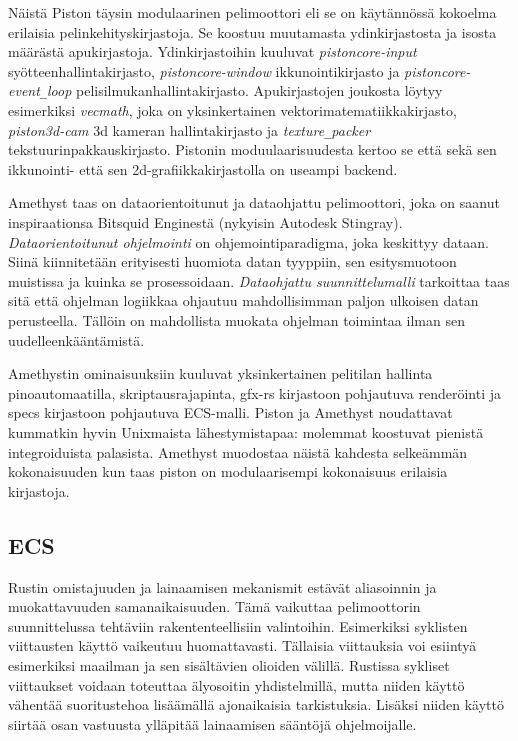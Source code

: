 \documentclass[finnish]{tktltiki2}
\theoremstyle{definition}
\theoremstyle{remark}
\begin{document}
Näistä Piston täysin modulaarinen pelimoottori eli se on käytännössä kokoelma erilaisia pelinkehityskirjastoja. Se koostuu muutamasta ydinkirjastosta ja isosta määrästä apukirjastoja. Ydinkirjastoihin kuuluvat \textit{pistoncore-input} syötteenhallintakirjasto, \textit{pistoncore-window} ikkunointikirjasto ja \textit{pistoncore-event\texttt{\_}loop} pelisilmukanhallintakirjasto. Apukirjastojen joukosta löytyy esimerkiksi \textit{vecmath}, joka on yksinkertainen vektorimatematiikkakirjasto, \textit{piston3d-cam} 3d kameran hallintakirjasto ja \textit{texture\texttt{\_}packer} tekstuurinpakkauskirjasto. Pistonin moduulaarisuudesta kertoo se että sekä sen ikkunointi- että sen 2d-grafiikkakirjastolla on useampi backend.  

Amethyst\cite{Amethyst} taas on dataorientoitunut ja dataohjattu pelimoottori, joka on saanut inspiraationsa Bitsquid Enginestä (nykyisin Autodesk Stingray)\cite{AmethystReadme}. \textit{Dataorientoitunut ohjelmointi} on ohjemointiparadigma, joka keskittyy dataan. Siinä kiinnitetään erityisesti huomiota datan tyyppiin, sen esitysmuotoon muistissa ja kuinka se prosessoidaan. \textit{Dataohjattu suunnittelumalli} tarkoittaa taas sitä että ohjelman logiikkaa ohjautuu mahdollisimman paljon ulkoisen datan perusteella. Tällöin on mahdollista muokata ohjelman toimintaa ilman sen uudelleenkääntämistä. \cite{AmethystGlossary}

Amethystin ominaisuuksiin kuuluvat yksinkertainen pelitilan hallinta pinoautomaatilla, skriptausrajapinta, gfx-rs kirjastoon pohjautuva renderöinti ja specs kirjastoon pohjautuva ECS-malli. Piston ja Amethyst noudattavat kummatkin hyvin Unixmaista lähestymistapaa: molemmat koostuvat pienistä integroiduista palasista. Amethyst muodostaa näistä kahdesta selkeämmän kokonaisuuden kun taas piston on modulaarisempi kokonaisuus erilaisia kirjastoja.

\subsection{ECS}
Rustin omistajuuden ja lainaamisen mekanismit estävät aliasoinnin ja muokattavuuden samanaikaisuuden. Tämä vaikuttaa pelimoottorin suunnittelussa tehtäviin rakententeellisiin valintoihin. Esimerkiksi syklisten viittausten käyttö vaikeutuu huomattavasti. Tällaisia viittauksia voi esiintyä esimerkiksi maailman ja sen sisältävien olioiden välillä. Rustissa sykliset viittaukset voidaan toteuttaa älyosoitin yhdistelmillä, mutta niiden käyttö vähentää suoritustehoa lisäämällä ajonaikaisia tarkistuksia. Lisäksi niiden käyttö siirtää osan vastuusta ylläpitää lainaamisen sääntöjä ohjelmoijalle.
\end{document}
